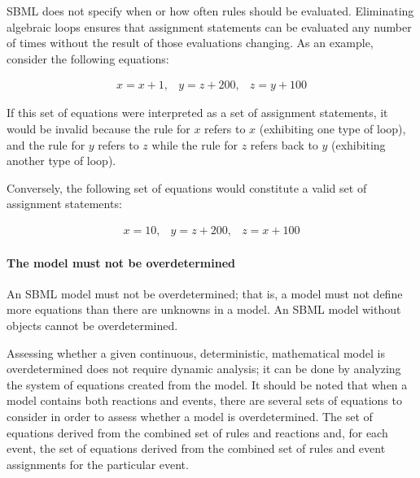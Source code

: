 SBML does not specify when or how often rules should be evaluated.
Eliminating algebraic loops ensures that assignment statements can
be evaluated any number of times without the result of those
evaluations changing.  As an example, consider the following
equations:
\begin{linenomath}
\begin{equation*}
  \begin{array}{lll}
    x = x + 1, & y = z + 200, & z = y + 100
  \end{array}
\end{equation*}
\end{linenomath}
If this set of equations were interpreted as a set of assignment
statements, it would be invalid because the rule for $x$ refers to
$x$ (exhibiting one type of loop), and the rule for $y$ refers to
$z$ while the rule for $z$ refers back to $y$ (exhibiting another
type of loop).

Conversely, the following set of equations would constitute a
valid set of assignment statements:
\begin{linenomath}
\begin{equation*}
  \begin{array}{lll}
    x = 10, & y = z + 200, & z = x + 100
  \end{array}
\end{equation*}
\end{linenomath}


\paragraph{The model must not be overdetermined}

An SBML model must not be overdetermined; that is, a model must
not define more equations than there are unknowns in a model.  An
SBML model without \AlgebraicRule objects cannot be
overdetermined.

Assessing whether a given continuous, deterministic, mathematical
model is overdetermined does not require dynamic analysis; it can
be done by analyzing the system of equations created from the
model.  It should be noted that when a model contains both
reactions and events, there are several sets of equations to
consider in order to assess whether a model is overdetermined.
The set of equations derived from the combined set of rules and
reactions and, for each event, the set of equations derived from
the combined set of rules and event assignments for the particular
event.

